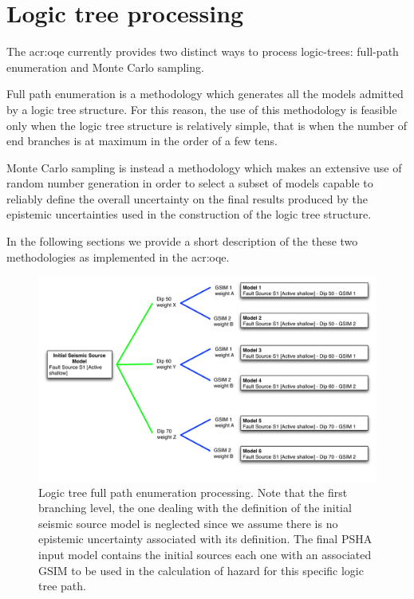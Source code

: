 \section{Logic tree processing}
The \gls{acr:oqe} currently provides two distinct ways to process 
logic-trees: full-path enumeration and Monte Carlo sampling. 

Full path enumeration is a methodology which generates all the 
models admitted by a logic tree structure. 
%
For this reason, the use of this methodology is feasible only when 
the logic tree structure is relatively simple, that is when the number 
of end branches is at maximum in the order of a few tens.

Monte Carlo sampling is instead a methodology which makes an extensive 
use of random number generation in order to select a subset of models 
capable to reliably define the overall uncertainty on the final results 
produced by the epistemic uncertainties used in the construction of the 
logic tree structure. 

In the following sections we provide a short description of 
the these two methodologies as implemented in the \gls{acr:oqe}.
%
\begin{figure}[ht]
\centering
\includegraphics[width=\textwidth]{./Pictures/lts/logic_tree_ex1.pdf}
\caption{Logic tree full path enumeration processing. Note that the
first branching level, the one dealing with the definition of the initial 
seismic source model is neglected since we assume there is no epistemic
uncertainty associated with its definition. The final PSHA input model 
contains the initial sources each one with an associated GSIM to be used 
in the calculation of hazard for this specific logic tree path.}
\label{fig:logic_tree_example1}
\end{figure}
%
